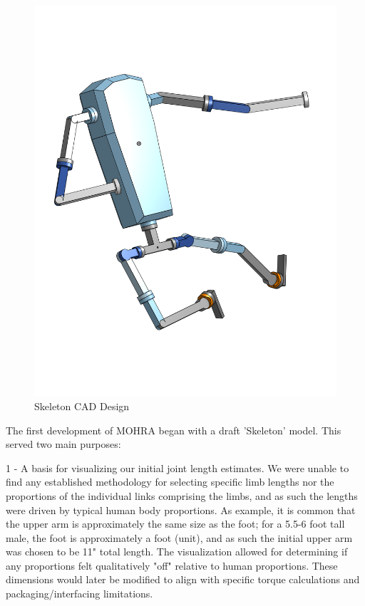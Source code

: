 \documentclass{article}
\begin{document}
\begin{figure}
    \centering
    \includegraphics[width=0.75\linewidth]{assets//Skeleton/Skele_FlyingKick.png}
    \caption{Skeleton CAD Design}
    \label{fig:enter-label}
\end{figure}

The first development of MOHRA began with a draft 'Skeleton' model. This served two main purposes:

1 - A basis for visualizing our initial joint length estimates. We were unable to find any established methodology for selecting specific limb lengths nor the proportions of the individual links comprising the limbs, and as such the lengths were driven by typical human body proportions. As example, it is common that the upper arm is approximately the same size as the foot; for a 5.5-6 foot tall male, the foot is approximately a foot (unit), and as such the initial upper arm was chosen to be 11" total length. The visualization allowed for determining if any proportions felt qualitatively "off" relative to human proportions. These dimensions would later be modified to align with specific torque calculations and packaging/interfacing limitations.
\end{document}
